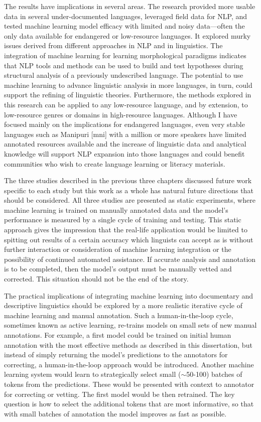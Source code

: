 The results have implications in several areas. The research provided more usable data in several under-documented languages, leveraged field data for NLP, and tested machine learning model efficacy with limited and noisy data---often the only data available for endangered or low-resource languages. It explored murky issues derived from different approaches in NLP and in linguistics. 
The integration of machine learning for learning morphological paradigms indicates that NLP tools and methods can be used to build and test hypotheses during structural analysis of a previously undescribed language. The potential to use machine learning to advance linguistic analysis in more languages, in turn, could support the refining of linguistic theories. Furthermore, the methods explored in this research can be applied to any low-resource language, and by extension, to low-resource genres or domains in high-resource languages. Although I have focused mainly on the implications for endangered languages, even very stable languages such as Manipuri [mni] with a million or more speakers have limited annotated resources available and the increase of linguistic data and analytical knowledge will support NLP expansion into those languages and could benefit communities who wish to create language learning or literacy materials. 

The three studies described in the previous three chapters discussed future work specific to each study but this work as a whole has natural future directions that should be considered. All three studies are presented as static experiments, where machine learning is trained on manually annotated data and the model's performance is measured by a single cycle of training and testing. This static approach gives the impression that the real-life application would be limited to spitting out results of a certain accuracy which linguists can accept as is without further interaction or consideration of machine learning integration or the possibility of continued automated assistance. If accurate analysis and annotation is to be completed, then the model's output must be manually vetted and corrected. This situation should not be the end of the story. 

The practical implications of integrating machine learning into documentary and descriptive linguistics should be explored by a more realistic iterative cycle of machine learning and manual annotation. Such a human-in-the-loop cycle, sometimes known as active learning, re-trains models on small sets of new manual annotations. 
For example, a first model could be trained on initial human annotation with the most effective methods as described in this dissertation, but instead of simply returning the model's predictions to the annotators for correcting, a human-in-the-loop approach would be introduced. Another machine learning system would learn to strategically select small ($\sim$50-100) batches of tokens from the predictions. These would be presented with context to annotator for correcting or vetting. The first model would be then retrained. The key question is how to select the additional tokens that are most informative, so that with small batches of annotation the model improves as fast as possible. 

